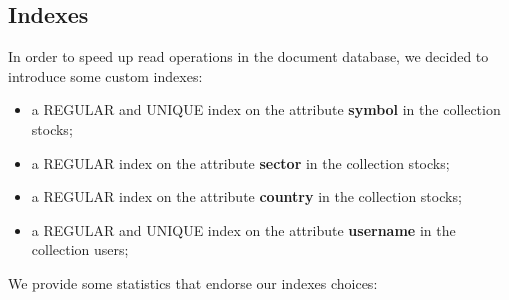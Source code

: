 \subsection{Indexes}
In order to speed up read operations in the document database, we decided to
introduce some custom indexes:
\begin{itemize}
    \item a REGULAR and UNIQUE index on the attribute \textbf{symbol} in the collection stocks;
    \item a REGULAR index on the attribute \textbf{sector} in the collection stocks;
    \item a REGULAR index on the attribute \textbf{country} in the collection stocks;
    \item a REGULAR and UNIQUE index on the attribute \textbf{username} in the collection users;
\end{itemize}
We provide some statistics that endorse our indexes choices:

